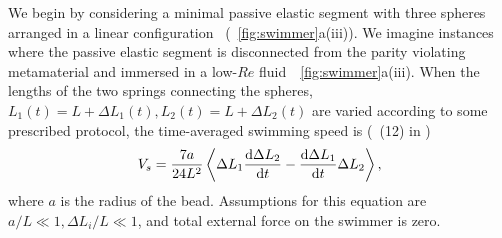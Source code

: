 \documentclass[
 preprint,
 preprintnumbers,
 amsmath,amssymb,
 aps,
 pre,
 longbibliography,
 superscriptaddress,
 10pt, twocolumn
]{revtex4-1}
\begin{document}
 We begin by considering a minimal passive elastic segment with three spheres arranged in a linear configuration~\cite{Golestanian2008AnalyticResults} (\figurename~\ref{fig:swimmer}a(iii)). We imagine instances where the passive elastic segment is disconnected from the parity violating metamaterial and immersed in a low-$Re$ fluid~\figurename~\ref{fig:swimmer}a(iii). When the lengths of the two springs connecting the spheres, $L_1(t) = L+\Delta L_1(t), L_2(t) = L+\Delta L_2(t)$ are varied according to some prescribed protocol, the time-averaged swimming speed is (\eqnname~(12) in \cite{Golestanian2008AnalyticResults})
\begin{equation} \label{eqn:swimmer_speed}
    V_s = \frac{7a}{24L^2} \expval{\Delta L_1 \dv{\Delta L_2}{t} - \dv{\Delta L_1}{t} \Delta{L_2}},
\end{equation}
where $a$ is the radius of the bead. Assumptions for this equation are $a/L \ll 1, \Delta L_i/L \ll 1$, and total external force on the swimmer is zero.

\end{document}
